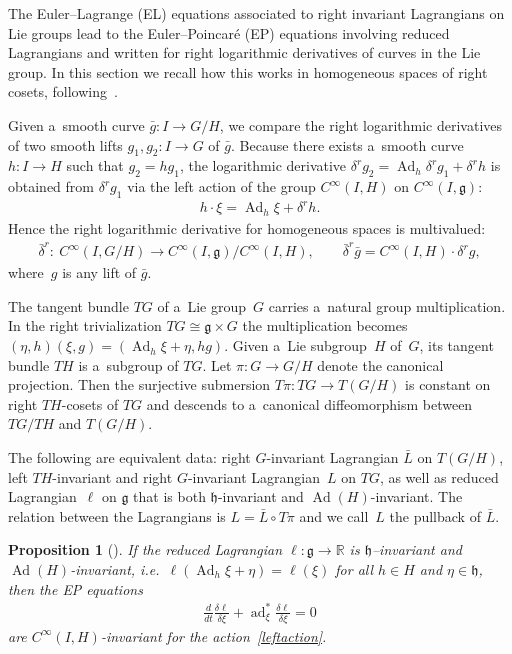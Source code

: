 \documentclass[10pt,a4paper]{amsart}
\numberwithin{equation}{section}
\newtheorem{Proposition}[Theorem]{Proposition}
{ \theoremstyle{definition}
\newtheorem{Example}[Theorem]{Example}
\newtheorem{Remark}[Theorem]{Remark} }
\begin{document}
The Euler--Lagrange (EL) equations associated to right invariant Lagrangians on Lie groups lead to the Euler--Poincar\'e
(EP) equations involving reduced Lagrangians and written for right logarithmic derivatives of curves in the Lie group.
In this section we recall how this works in homogeneous spaces of right cosets, following~\cite{TV}.

Given a~smooth curve $\bar g:I\to G/H$, we compare the right logarithmic derivatives of two smooth lifts $g_1,g_2:I\to
G$ of $\bar g$.
Because there exists a~smooth curve $h:I\to H$ such that $g_2=hg_1$, the logarithmic derivative $\delta^r
g_2=\operatorname{Ad}_h\delta^rg_1+\delta^rh$ is obtained from $\delta^r g_1$ via the left action of the group
$C^{\infty}(I,H)$ on $C^{\infty}(I,\mathfrak g)$:
\begin{gather}
\label{leftaction}
h\cdot \xi=\operatorname{Ad}_h\xi+\delta^rh.
\end{gather}
Hence the right logarithmic derivative for homogeneous spaces is multivalued:
\begin{gather}
\label{logderhom}
\bar\delta^r: \ C^{\infty}(I,G/H)\to C^{\infty}(I,\mathfrak g)/C^{\infty}(I,H),
\qquad
\bar\delta^r\bar g=C^{\infty}(I,H)\cdot\delta^r g,
\end{gather}
where~$g$ is any lift of $\bar g$.

The tangent bundle $TG$ of a~Lie group~$G$ carries a~natural group multiplication.
In the right trivialization $TG\cong \mathfrak g\times G$ the multiplication becomes
$(\eta,h)(\xi,g)=(\operatorname{Ad}_h\xi+\eta,hg)$.
Given a~Lie subgroup~$H$ of~$G$, its tangent bundle $TH$ is a~subgroup of $TG$.
Let $\pi:G\to G/H$ denote the canonical projection.
Then the   surjective submersion $T\pi:TG\to T(G/H)$ is constant on right $TH$-cosets of $TG$ and descends to
a~canonical dif\/feomorphism between $TG/TH$ and $T(G/H)$.

The following are equivalent data: right $G$-invariant Lagrangian $\bar L$ on $T(G/H)$, left $TH$-invariant and
right $G$-invariant Lagrangian~$L$ on $TG$, as well as reduced Lagrangian~$\ell$ on $\mathfrak g$ that is both
$\mathfrak h$-invariant and $\operatorname{Ad}(H)$-invariant.
The relation between the Lagrangians is $L=\bar L\circ T\pi$ and we call~$L$ the pullback of $\bar L$.

\begin{Proposition}[\cite{TV}]
\label{elhomo}
If the reduced Lagrangian $\ell:\mathfrak g\to\mathbb R$ is $\mathfrak h$--invariant and
$\operatorname{Ad}(H)$-invariant, i.e.\ $\ell(\operatorname{Ad}_h\xi+\eta)=\ell(\xi)$ for all $h\in H$ and
$\eta\in\mathfrak h$, then the EP equations
\begin{gather}
\label{ep}
\frac{d}{dt}\frac{\delta\ell}{\delta \xi}+\operatorname{ad}^*_\xi\frac{\delta\ell}{\delta\xi}=0
\end{gather}
are $C^{\infty}(I,H)$-invariant for the action~\eqref{leftaction}.
\end{Proposition}
\end{document}
